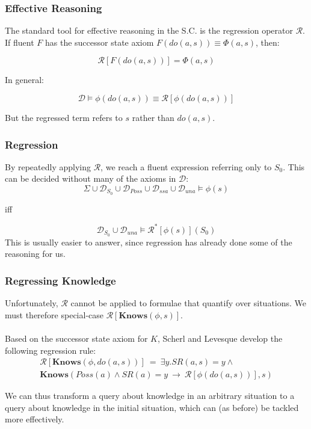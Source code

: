 \documentclass{beamer}
\begin{document}
\begin{frame}
\frametitle{Effective Reasoning}
The standard tool for effective reasoning in the S.C. is the
regression operator $\mathcal{R}$. If fluent $F$ has the successor state axiom
$F(do(a,s)) \equiv \Phi(a,s)$, then:

\[ \mathcal{R}[F(do(a,s))] = \Phi(a,s) \]

\pause
In general:

\[  \mathcal{D} \models \phi(do(a,s)) \equiv \mathcal{R}[\phi(do(a,s))] \]

But the regressed term refers to $s$ rather than $do(a,s)$.

\end{frame}

\begin{frame}
\frametitle{Regression}
By repeatedly applying $\mathcal{R}$, we reach a fluent expression referring
only to $S_0$.  This can be decided without many of the axioms in $\mathcal{D}$:
\begin{equation*}
  \Sigma \cup \mathcal{D}_{S_0} \cup \mathcal{D}_{Poss} \cup \mathcal{D}_{ssa} \cup \mathcal{D}_{una} \models \phi(s)
\end{equation*}
\begin{center}
iff
\end{center}
\begin{equation*}
  \mathcal{D}_{S_0} \cup \mathcal{D}_{una} \models \mathcal{R}^{*}[\phi(s)](S_0)
\end{equation*}
This is usually easier to answer, since regression has already done some
of the reasoning for us.
\end{frame}

\begin{frame}
\frametitle{Regressing Knowledge}
Unfortunately, $\mathcal{R}$ cannot be applied to formulae that quantify
over situations.  We must therefore special-case
$\mathcal{R}[\mathbf{Knows}(\phi,s)]$.
\ \\
\ \\
Based on the successor state axiom for $K$, Scherl and Levesque develop
the following regression rule:
\begin{multline*}
  \mathcal{R}[\mathbf{Knows}(\phi,do(a,s))]\ =\ 
    \exists y . SR(a,s) = y \wedge \\
    \mathbf{Knows}(Poss(a) \wedge SR(a)=y\ \rightarrow\ \mathcal{R}[\phi(do(a,s))],s)
\end{multline*}

We can thus transform a query about knowledge in an arbitrary situation to
a query about knowledge in the initial situation, which can (as before) be
tackled more effectively.

\end{frame}
\end{document}
